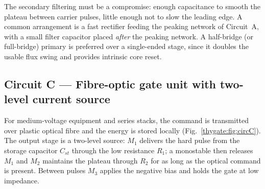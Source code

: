 The secondary filtering must be a compromise: enough capacitance to smooth the
plateau between carrier pulses, little enough not to slow the leading edge. A
common arrangement is a fast rectifier feeding the peaking network of Circuit~A,
with a small filter capacitor placed \emph{after} the peaking network. A half-bridge
(or full-bridge) primary is preferred over a single-ended stage, since it doubles
the usable flux swing and provides intrinsic core reset.

\subsection{Circuit C --- Fibre-optic gate unit with two-level current source}

For medium-voltage equipment and series stacks, the command is transmitted over
plastic optical fibre and the energy is stored locally (Fig.~\ref{thygate:fig:circC}). The
output stage is a two-level source: $M_1$ delivers the hard pulse from the storage
capacitor $C_{st}$ through the low resistance $R_1$; a monostable then releases
$M_1$ and $M_2$ maintains the plateau through $R_2$ for as long as the optical
command is present. Between pulses $M_3$ applies the negative bias and holds the
gate at low impedance.

